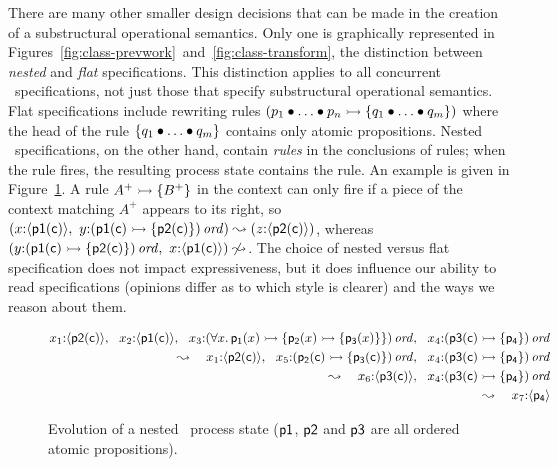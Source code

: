 There are many other smaller design decisions that can be made in the
creation of a substructural operational semantics. Only one is
graphically represented in
Figures~\ref{fig:class-prevwork}~and~\ref{fig:class-transform}, the
distinction between {\it nested} and {\it flat}
specifications. This distinction applies to all concurrent
\sls~specifications, not just those that specify substructural
operational semantics. Flat
specifications include rewriting rules $\left( p_1 \mathbin{\bullet} \ldots \mathbin{\bullet}
  p_n \rightarrowtail \{ q_1 \mathbin{\bullet} \ldots \mathbin{\bullet} q_m \} \right)$ where the head
of the rule $\{ q_1 \mathbin{\bullet} \ldots \mathbin{\bullet} q_m \}$ contains only atomic
propositions. Nested \sls~specifications, on the other hand,
contain {\it rules} in the conclusions of rules; when the rule fires,
the resulting process state contains the rule. An example is given 
in Figure~\ref{fig:ho-evo-ex}.
A rule $A^+ \rightarrowtail \{ B^+ \}$ in the context can only fire if a piece 
of the context
matching $A^+$ appears to its right, so  $\left(x{:}\langle {\sf p1(c)} \rangle, ~
y{:}{\left( {\sf p1(c)} \rightarrowtail \{ {\sf p2(c)} \} \right)}\,{{\it ord}}\right)
\leadsto \left(z{:}\langle {\sf p2(c)} \rangle\right)$, whereas 
$\left(y{:}{\left( {\sf p1(c)} \rightarrowtail \{ {\sf p2(c)} \} \right)}\,{{\it ord}},~
x{:}\langle {\sf p1(c)} \rangle\right)
\not \leadsto$. 
%
The choice of nested versus flat specification does not
impact expressiveness, but it does influence our ability to read
specifications (opinions differ as to which style is clearer) and 
the ways we reason about them.

\begin{figure}
\begin{align*}
x_1{:}\langle {{\sf p2}({\sf c})} \rangle, ~~
x_2{:}\langle {{\sf p1}({\sf c})} \rangle, ~~
x_3{:}{(\forall x.\,{\sf p_1}(x) 
                \rightarrowtail \{ {\sf p_2}(x) \rightarrowtail \{ {\sf p_3}(x) \} \})}\,{{\it ord}}, ~~
x_4{:}{({\sf p3}({\sf c}) \rightarrowtail \{ {\sf p_4} \})}\,{{\it ord}} & \\
\leadsto ~~~ 
x_1{:}\langle {{\sf p2}({\sf c})} \rangle, ~~
x_5{:}{({\sf p_2}({\sf c}) \rightarrowtail \{ {\sf p_3}({\sf c}) \})}\,{{\it ord}}, ~~
x_4{:}{({\sf p3}({\sf c}) \rightarrowtail \{ {\sf p_4} \})}\,{{\it ord}} & \\
\leadsto ~~~ 
x_6{:}\langle {{\sf p3}({\sf c})} \rangle, ~~
x_4{:}{({\sf p3}({\sf c}) \rightarrowtail \{ {\sf p_4} \})}\,{{\it ord}} & \\
\leadsto ~~~ 
x_7{:}\langle {{\sf p_4}} \rangle & 
\end{align*}
\caption{Evolution of a nested \sls~process state (${\sf p1}$, ${\sf
  p2}$ and ${\sf p3}$ are all ordered atomic propositions).}
\label{fig:ho-evo-ex}
\end{figure}

